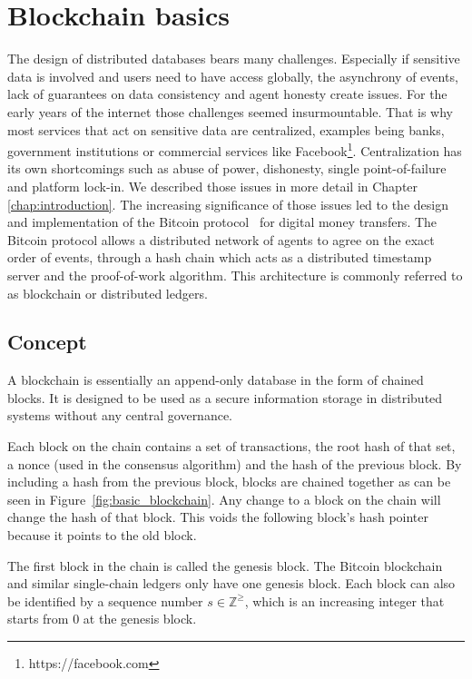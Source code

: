 \section{Blockchain basics}
The design of distributed databases bears many challenges. Especially if sensitive data is involved
and users need to have access globally, the asynchrony of events, lack of guarantees on data 
consistency and agent honesty create issues. For the early years of the internet those challenges seemed
insurmountable. That is why most services that act on sensitive data are centralized, examples being 
banks, government institutions or commercial services like Facebook\footnote{https://facebook.com}.
Centralization has its own shortcomings such as abuse of power, dishonesty, single point-of-failure
and platform lock-in. We described those issues in more detail in Chapter \ref{chap:introduction}.
The increasing significance of those issues led to the design and implementation of the Bitcoin 
protocol~\cite{nakamoto2008bitcoin} for digital money transfers. The Bitcoin protocol allows a distributed network of agents 
to agree on the exact order of events, through a hash chain which acts as a distributed timestamp 
server and the proof-of-work algorithm. This architecture is commonly referred to as blockchain or
distributed ledgers.

\subsection{Concept}
A blockchain is essentially an append-only database in the form of chained blocks. It is designed to be
used as a secure information storage in distributed systems without any central governance. 

Each block on the chain contains a set of transactions, the root hash of that set, a nonce (used in 
the consensus algorithm) and the hash of the previous block. By including a hash from the previous block,
blocks are chained together as can be seen in Figure~\ref{fig:basic_blockchain}. Any 
change to a block on the chain will change the hash of that block. This voids the following block's
hash pointer because it points to the old block. 

The first block in the chain 
is called the genesis block. The Bitcoin blockchain and similar single-chain ledgers only have 
one genesis block. Each block can also be identified by a sequence number $s \in \mathbb{Z^\geq}$, which is an increasing 
integer that starts from 0 at the genesis block.

